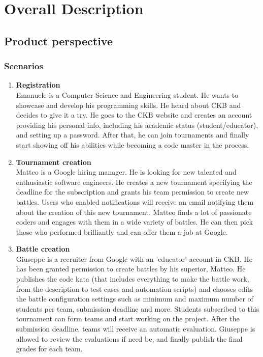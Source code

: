 \section{Overall Description}

\subsection{Product perspective}
\subsubsection{Scenarios}
\begin{enumerate}[label=\textbf{\Alph*}.]
    \item \textbf{Registration} \\
        Emanuele is a Computer Science and Engineering student. He wants to showcase and develop his programming skills. He heard about CKB and decides to give it a try. He goes to the CKB website and creates an account providing his personal info, including his academic status (student/educator),  and setting up a password. After that, he can join tournaments and finally start showing off his abilities while becoming a code master in the process.\\
    \item \textbf{Tournament creation} \\
        Matteo is a Google hiring manager. He is looking for new talented and enthusiastic software engineers. He creates a new tournament specifying the deadline for the subscription and grants his team permission to create new battles. Users who enabled notifications will receive an email notifying them about the creation of this new tournament. Matteo finds a lot of passionate coders and engages with them in a wide variety of battles. He can then pick those who performed brilliantly and can offer them a job at Google.\\
    \item \textbf{Battle creation} \\
        Giuseppe is a recruiter from Google with an 'educator' account in CKB. He has been granted permission to create battles  by his superior, Matteo. He publishes the code kata (that includes everything to make the battle work, from the description to test cases and automation scripts) and chooses edits the battle configuration settings such as minimum and maximum number of students per team, submission deadline and more. Students subscribed to this tournament can form teams and start working on the project. After the submission deadline, teams will receive an automatic evaluation. Giuseppe is allowed to review the evaluations if need be, and finally publish the final grades for each team.  \\ 

\end{enumerate}
